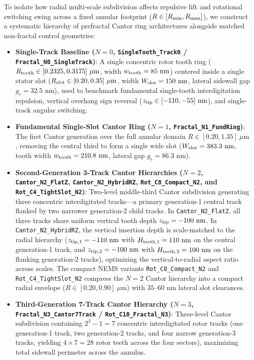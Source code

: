 \documentclass[11pt,letterpaper]{article}
\begin{document}
To isolate how radial multi-scale subdivision affects repulsive lift and rotational switching swing across a fixed annular footprint ($R \in [R_{\rm min}, R_{\rm max}]$), we construct a systematic hierarchy of prefractal Cantor ring architectures alongside matched non-fractal control geometries:
\begin{itemize}
    \item \textbf{Single-Track Baseline ($N=0$, \texttt{SingleTooth\_Track0} / \texttt{Fractal\_N0\_SingleTrack})}: A single concentric rotor tooth ring ($R_{\rm tooth} \in [0.2325, 0.3175]\ \mu\text{m}$, width $w_{\rm tooth} = 85\text{ nm}$) centered inside a single stator slot ($R_{\rm slot} \in [0.20, 0.35]\ \mu\text{m}$, width $W_{\rm slot} = 150\text{ nm}$, lateral sidewall gap $g_r = 32.5\text{ nm}$), used to benchmark fundamental single-tooth interdigitation repulsion, vertical overhang sign reversal ($z_{\rm tip} \in [-110, -55]\text{ nm}$), and single-track angular switching.
    \item \textbf{Fundamental Single-Slot Cantor Ring ($N=1$, \texttt{Fractal\_N1\_FundRing})}: The first Cantor generation over the full annular domain $R \in [0.20, 1.35]\ \mu\text{m}$, removing the central third to form a single wide slot ($W_{\rm slot} = 383.3\text{ nm}$, tooth width $w_{\rm tooth} = 210.8\text{ nm}$, lateral gap $g_r = 86.3\text{ nm}$).
    \item \textbf{Second-Generation 3-Track Cantor Hierarchies ($N=2$, \texttt{Cantor\_N2\_FlatZ}, \texttt{Cantor\_N2\_HybridRZ}, \texttt{Rot\_C8\_Compact\_N2}, and \texttt{Rot\_C4\_TightSlot\_N2})}: Two-level middle-third Cantor subdivision generating three concentric interdigitated tracks---a primary generation-1 central track flanked by two narrower generation-2 child tracks. In \texttt{Cantor\_N2\_FlatZ}, all three tracks share uniform vertical tooth depth $z_{\rm tip} = -100\text{ nm}$. In \texttt{Cantor\_N2\_HybridRZ}, the vertical insertion depth is scale-matched to the radial hierarchy ($z_{\rm tip,1} = -110\text{ nm}$ with $H_{\rm teeth,1} = 110\text{ nm}$ on the central generation-1 track, and $z_{\rm tip,2} = -100\text{ nm}$ with $H_{\rm teeth,2} = 100\text{ nm}$ on the flanking generation-2 tracks), optimizing the vertical-to-radial aspect ratio across scales. The compact NEMS variants \texttt{Rot\_C8\_Compact\_N2} and \texttt{Rot\_C4\_TightSlot\_N2} compress the $N=2$ Cantor hierarchy into a compact radial envelope ($R \in [0.20, 0.90]\ \mu\text{m}$) with $35\text{--}60\text{ nm}$ lateral slot clearances.
    \item \textbf{Third-Generation 7-Track Cantor Hierarchy ($N=3$, \texttt{Fractal\_N3\_Cantor7Track} / \texttt{Rot\_C10\_Fractal\_N3})}: Three-level Cantor subdivision containing $2^3 - 1 = 7$ concentric interdigitated rotor tracks (one generation-1 track, two generation-2 tracks, and four narrow generation-3 tracks, yielding $4 \times 7 = 28$ rotor teeth across the four sectors), maximizing total sidewall perimeter across the annulus.

\end{itemize}
\end{document}
